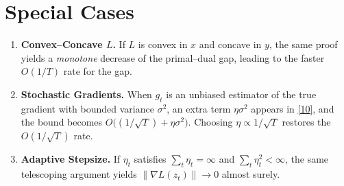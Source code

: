 \documentclass{article}
\begin{document}
\section*{Special Cases}
\begin{enumerate}[label={\bf S\arabic*:},leftmargin=*,itemsep=2pt]
\item \textbf{Convex–Concave $L$.}  
If $L$ is convex in $x$ and concave in $y$, the same proof yields a \emph{monotone} decrease of the primal–dual gap, leading to the faster $O(1/T)$ rate for the gap.
\item \textbf{Stochastic Gradients.}  
When $g_t$ is an unbiased estimator of the true gradient with bounded variance $\sigma^2$, an extra term $\eta\sigma^2$ appears in \eqref{10}, and the bound becomes $O\bigl((1/\sqrt{T})+\eta\sigma^2\bigr)$. Choosing $\eta\propto1/\sqrt{T}$ restores the $O(1/\sqrt{T})$ rate.
\item \textbf{Adaptive Stepsize.}  
If $\eta_t$ satisfies $\sum_{t}\eta_t=\infty$ and $\sum_{t}\eta_t^{2}<\infty$, the same telescoping argument yields $\|\nabla L(z_t)\|\to0$ almost surely.
\end{enumerate}
\end{document}
